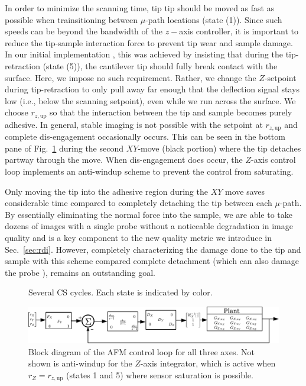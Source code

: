 \documentclass[journal]{IEEEtran}
\newcommand{\rzup}{\ensuremath{r_{z,\textrm{up}}}\xspace}
\begin{document}
In order to minimize the scanning time, tip tip should be moved as fast as possible when trainsitioning between $\mu$-path locations (state (1)). Since such speeds can be beyond the bandwidth of the $z-$axis controller, it is important to reduce the tip-sample interaction force to prevent tip wear and sample damage. In our initial implementation \cite{braker_hardware_2018}, 
this was achieved by insisting that during the
tip-retraction (state (5)), the cantilever tip should fully break
contact with the surface. Here, we impose no such requirement. Rather,
we change the $Z$-setpoint during tip-retraction to only pull away far
enough that the deflection signal stays low (i.e., below the scanning
setpoint), even while we run across the surface. We choose \rzup so
that the interaction between the tip and sample becomes purely
adhesive. In general, stable imaging is not possible with the setpoint at \rzup and
complete dis-engagement occasionally occurs. This can be seen in the bottom pane of
Fig.~\ref{fig:cs_cycle} during the second $XY$-move (black portion) where the tip detaches partway through the move.
When dis-engagement does occur, the $Z$-axis control loop implements an anti-windup scheme to prevent the control from saturating.


Only moving the tip into the adhesive region during the $XY$ move saves considerable time
compared to completely detaching the tip between each $\mu$-path. By essentially eliminating the normal force into the sample, we are able to take dozens of images with a single probe without a noticeable degradation in image quality and is a key component to the new quality metric we introduce in Sec.~\ref{sec:rdi}. However, completely characterizing the damage done to the tip and sample with this scheme compared complete detachment (which can also damage the probe \cite{meyer_atomic_1992}), remains an outstanding goal.

\begin{figure}[t!]
  \centering 
  \caption{Several CS cycles. Each state is indicated by color.}
  \label{fig:cs_cycle}
\end{figure}

\begin{figure}[ht!]
  \centering
  \includegraphics[width=1\textwidth]{figures/AFM_loop_xyz.pdf}
  \caption{Block diagram of the AFM control loop for all three axes.
    Not shown is anti-windup for the $Z$-axis integrator, which is active
    when $r_Z=\rzup$ (states 1 and 5) where sensor saturation is possible.}
  \label{fig:afm_bd_dinv}
\end{figure}
\end{document}

